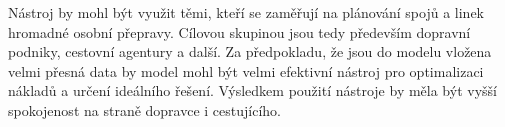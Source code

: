 \documentclass[a4paper]{article}
\begin{document}
			Nástroj by mohl být využit těmi, kteří se zaměřují na plánování spojů a linek hromadné osobní přepravy. Cílovou skupinou jsou tedy především dopravní podniky, cestovní agentury a další. Za předpokladu, že jsou do modelu vložena velmi přesná data by model mohl být velmi efektivní nástroj pro optimalizaci nákladů a určení ideálního řešení. Výsledkem použití nástroje by měla být vyšší spokojenost na straně dopravce i cestujícího.
            


    \newpage

    \renewcommand{\refname}{Použitá literatura}
    
    
\end{document}
